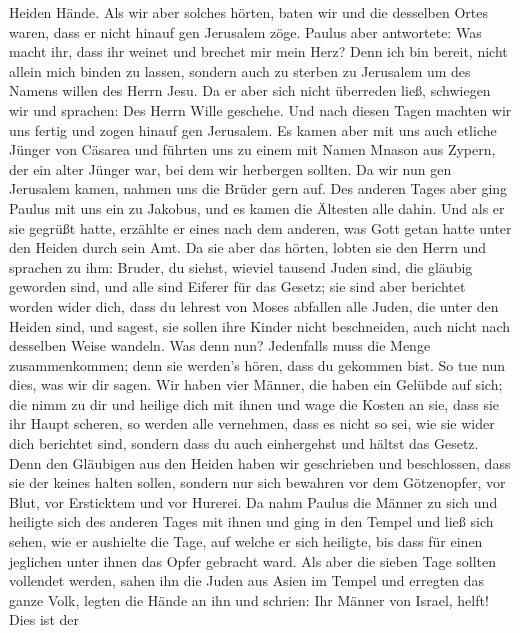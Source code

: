 Heiden Hände.  Als wir aber solches hörten, baten wir und
die desselben Ortes waren, dass er nicht hinauf gen Jerusalem zöge.
 Paulus aber antwortete: Was macht ihr, dass ihr weinet und
brechet mir mein Herz? Denn ich bin bereit, nicht allein mich binden zu
lassen, sondern auch zu sterben zu Jerusalem um des Namens willen des
Herrn Jesu.  Da er aber sich nicht überreden ließ,
schwiegen wir und sprachen: Des Herrn Wille geschehe.  Und
nach diesen Tagen machten wir uns fertig und zogen hinauf gen Jerusalem.
 Es kamen aber mit uns auch etliche Jünger von Cäsarea und
führten uns zu einem mit Namen Mnason aus Zypern, der ein alter Jünger
war, bei dem wir herbergen sollten.  Da wir nun gen
Jerusalem kamen, nahmen uns die Brüder gern auf.  Des
anderen Tages aber ging Paulus mit uns ein zu Jakobus, und es kamen die
Ältesten alle dahin.  Und als er sie gegrüßt hatte,
erzählte er eines nach dem anderen, was Gott getan hatte unter den
Heiden durch sein Amt.  Da sie aber das hörten, lobten sie
den Herrn und sprachen zu ihm: Bruder, du siehst, wieviel tausend Juden
sind, die gläubig geworden sind, und alle sind Eiferer für das Gesetz;
 sie sind aber berichtet worden wider dich, dass du lehrest
von Moses abfallen alle Juden, die unter den Heiden sind, und sagest,
sie sollen ihre Kinder nicht beschneiden, auch nicht nach desselben
Weise wandeln.  Was denn nun? Jedenfalls muss die Menge
zusammenkommen; denn sie werden's hören, dass du gekommen bist.
 So tue nun dies, was wir dir sagen.  Wir
haben vier Männer, die haben ein Gelübde auf sich; die nimm zu dir und
heilige dich mit ihnen und wage die Kosten an sie, dass sie ihr Haupt
scheren, so werden alle vernehmen, dass es nicht so sei, wie sie wider
dich berichtet sind, sondern dass du auch einhergehst und hältst das
Gesetz.  Denn den Gläubigen aus den Heiden haben wir
geschrieben und beschlossen, dass sie der keines halten sollen, sondern
nur sich bewahren vor dem Götzenopfer, vor Blut, vor Ersticktem und vor
Hurerei.  Da nahm Paulus die Männer zu sich und heiligte
sich des anderen Tages mit ihnen und ging in den Tempel und ließ sich
sehen, wie er aushielte die Tage, auf welche er sich heiligte, bis dass
für einen jeglichen unter ihnen das Opfer gebracht ward. 
Als aber die sieben Tage sollten vollendet werden, sahen ihn die Juden
aus Asien im Tempel und erregten das ganze Volk, legten die Hände an ihn
und schrien:  Ihr Männer von Israel, helft! Dies ist der
